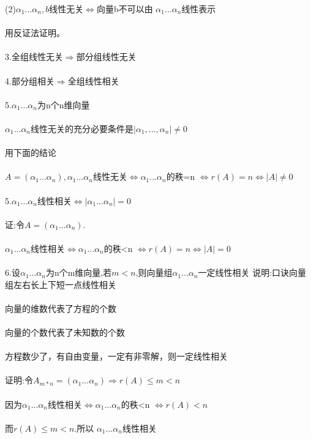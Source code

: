 \documentclass[12pt]{article}
\begin{document}
(2)$\alpha_1...\alpha_n,b$线性无关$\Leftrightarrow $向量b不可以由 $\alpha_1...\alpha_n$线性表示 \\ \\
用反证法证明。\\ \\
3.全组线性无关$\Rightarrow$部分组线性无关 \\ \\
4.部分组相关$\Rightarrow$全组线性相关\\ \\
5.$\alpha_1...\alpha_n$为n个n维向量 \\ \\
$\alpha_1...\alpha_n$线性无关的充分必要条件是$|\alpha_1,...,\alpha_n|\neq 0$\\ \\
用下面的结论 \\ \\
$A=(\alpha_1...\alpha_n),\alpha_1...\alpha_n$线性无关$\Leftrightarrow$$\alpha_1...\alpha_n$的秩=n $\Leftrightarrow r(A)=n \Leftrightarrow |A|\neq 0$ \\ \\
5.$\alpha_1...\alpha_n$线性相关$\Leftrightarrow|\alpha_1...\alpha_n|=0$ \\ \\
证:令$A=(\alpha_1...\alpha_n)$.\\ \\
$\alpha_1...\alpha_n$线性相关$\Leftrightarrow \alpha_1...\alpha_n $的秩<n $\Leftrightarrow r(A)=n \Leftrightarrow |A| = 0$ \\ \\
6.设$\alpha_1...\alpha_n$为n个m维向量,若$m<n$,则向量组$\alpha_1...\alpha_n$一定线性相关
说明:口诀向量组左右长上下短一点线性相关\\ \\
向量的维数代表了方程的个数 \\ \\
向量的个数代表了未知数的个数 \\ \\
方程数少了，有自由变量，一定有非零解，则一定线性相关 \\ \\
证明:令$A_{m*n}=(\alpha_1...\alpha_n) \Rightarrow r(A) \leq m < n$\\ \\ 
因为$\alpha_1...\alpha_n$线性相关$\Leftrightarrow \alpha_1...\alpha_n$的秩<n  $\Leftrightarrow r(A)<n$ \\ \\
而$r(A)\leq m<n.$所以 $\alpha_1...\alpha_n$线性相关
\end{document}
